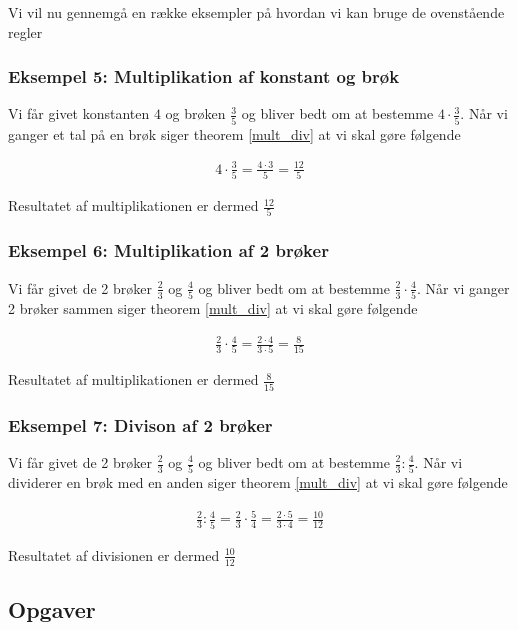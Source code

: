 Vi vil nu gennemgå en række eksempler på hvordan vi kan bruge de ovenstående regler

\subsubsection*{Eksempel 5: Multiplikation af konstant og brøk}

Vi får givet konstanten $4$ og brøken $\frac{3}{5}$ og bliver bedt om at bestemme $4\cdot \frac{3}{5}$. Når vi ganger et tal på en brøk siger theorem \ref{mult_div} at vi skal gøre følgende

\begin{align*}
4\cdot \frac{3}{5} = \frac{4\cdot 3}{5} = \frac{12}{5}
\end{align*}

Resultatet af multiplikationen er dermed $\frac{12}{5}$


\subsubsection*{Eksempel 6: Multiplikation af 2 brøker}

Vi får givet de 2 brøker $\frac{2}{3}$ og $\frac{4}{5}$ og bliver bedt om at bestemme $\frac{2}{3} \cdot \frac{4}{5}$. Når vi ganger 2 brøker sammen siger theorem \ref{mult_div} at vi skal gøre følgende

\begin{align*}
\frac{2}{3} \cdot \frac{4}{5} = \frac{2\cdot 4}{3\cdot 5} = \frac{8}{15}
\end{align*}

Resultatet af multiplikationen er dermed $\frac{8}{15}$

\subsubsection*{Eksempel 7: Divison af 2 brøker}

Vi får givet de 2 brøker $\frac{2}{3}$ og $\frac{4}{5}$ og bliver bedt om at bestemme $\frac{2}{3} : \frac{4}{5}$. Når vi dividerer en brøk med en anden siger theorem \ref{mult_div} at vi skal gøre følgende

\begin{align*}
\frac{2}{3} : \frac{4}{5} = \frac{2}{3} \cdot \frac{5}{4} = \frac{2\cdot 5}{3\cdot 4} = \frac{10}{12}
\end{align*}

Resultatet af divisionen er dermed $\frac{10}{12}$


\subsection*{Opgaver}




